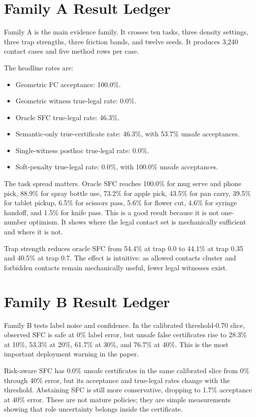 \documentclass{article}
\begin{document}
\section{Family A Result Ledger}

Family A is the main evidence family. It crosses ten tasks, three density settings, three trap strengths, three friction bands, and twelve seeds. It produces 3,240 contact cases and five method rows per case.

The headline rates are:
\begin{itemize}
\item Geometric FC acceptance: 100.0\%.
\item Geometric witness true-legal rate: 0.0\%.
\item Oracle SFC true-legal rate: 46.3\%.
\item Semantic-only true-certificate rate: 46.3\%, with 53.7\% unsafe acceptances.
\item Single-witness posthoc true-legal rate: 0.0\%.
\item Soft-penalty true-legal rate: 0.0\%, with 100.0\% unsafe acceptances.
\end{itemize}

The task spread matters. Oracle SFC reaches 100.0\% for mug serve and phone pick, 88.9\% for spray bottle use, 73.2\% for apple pick, 43.5\% for pan carry, 39.5\% for tablet pickup, 6.5\% for scissors pass, 5.6\% for flower cut, 4.6\% for syringe handoff, and 1.5\% for knife pass. This is a good result because it is not one-number optimism. It shows where the legal contact set is mechanically sufficient and where it is not.

Trap strength reduces oracle SFC from 54.4\% at trap 0.0 to 44.1\% at trap 0.35 and 40.5\% at trap 0.7. The effect is intuitive: as allowed contacts cluster and forbidden contacts remain mechanically useful, fewer legal witnesses exist.

\section{Family B Result Ledger}

Family B tests label noise and confidence. In the calibrated threshold-0.70 slice, observed SFC is safe at 0\% label error, but unsafe false certificates rise to 28.3\% at 10\%, 53.3\% at 20\%, 61.7\% at 30\%, and 76.7\% at 40\%. This is the most important deployment warning in the paper.

Risk-aware SFC has 0.0\% unsafe certificates in the same calibrated slice from 0\% through 40\% error, but its acceptance and true-legal rates change with the threshold. Abstaining SFC is still more conservative, dropping to 1.7\% acceptance at 40\% error. These are not mature policies; they are simple measurements showing that role uncertainty belongs inside the certificate.
\end{document}
